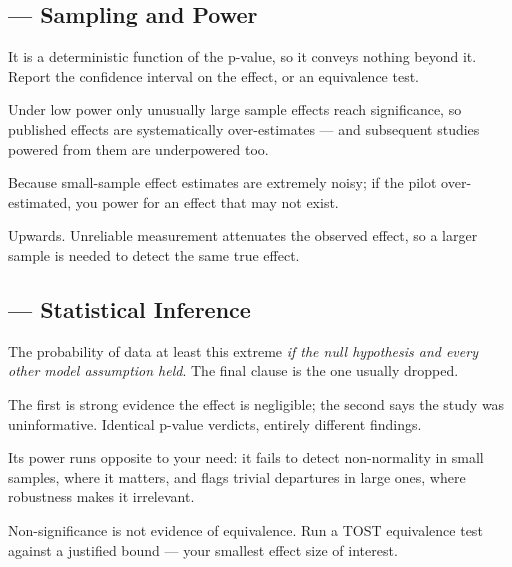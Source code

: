 \subsection*{ --- Sampling and Power}
\begin{tightnum}
  \item It is a deterministic function of the p-value, so it conveys nothing
    beyond it. Report the confidence interval on the effect, or an equivalence
    test.
  \item Under low power only unusually large sample effects reach significance,
    so published effects are systematically over-estimates --- and subsequent
    studies powered from them are underpowered too.
  \item Because small-sample effect estimates are extremely noisy; if the pilot
    over-estimated, you power for an effect that may not exist.
  \item Upwards. Unreliable measurement attenuates the observed effect, so a
    larger sample is needed to detect the same true effect.
\end{tightnum}

\subsection*{ --- Statistical Inference}
\begin{tightnum}
  \item The probability of data at least this extreme \emph{if the null
    hypothesis and every other model assumption held}. The final clause is the
    one usually dropped.
  \item The first is strong evidence the effect is negligible; the second says
    the study was uninformative. Identical p-value verdicts, entirely different
    findings.
  \item Its power runs opposite to your need: it fails to detect non-normality
    in small samples, where it matters, and flags trivial departures in large
    ones, where robustness makes it irrelevant.
  \item Non-significance is not evidence of equivalence. Run a TOST equivalence
    test against a justified bound --- your smallest effect size of interest.
\end{tightnum}

